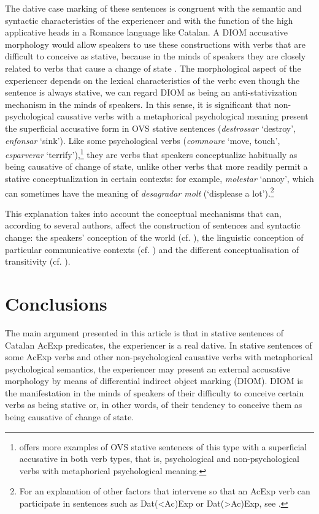 \documentclass[output=paper,colorlinks,citecolor=brown,modfonts,nonflat]{langsci/langscibook}
\begin{document}
The dative case marking of these sentences is congruent with the semantic and syntactic characteristics of the experiencer and with the function of the high applicative heads in a Romance language like Catalan. A DIOM accusative morphology would allow speakers to use these constructions with verbs that are difficult to conceive as stative, because in the minds of speakers they are closely related to verbs that cause a change of state . The morphological aspect of the experiencer depends on the lexical characteristics of the verb: even though the sentence is always stative, we can regard DIOM as being an anti-stativization mechanism in the minds of speakers. In this sense, it is significant that non-psychological causative verbs with a metaphorical psychological meaning present the superficial accusative form in OVS stative sentences (\textit{destrossar} ‘destroy’, \textit{enfonsar} ‘sink’). Like some psychological verbs (\textit{commoure} ‘move, touch’, \textit{esparverar} ‘terrify’),\footnote{\citet[14, 29--30]{Ginebra2003} offers more examples of OVS stative sentences of this type with a superficial accusative in both verb types, that is, psychological and non-psychological verbs with metaphorical psychological meaning.} they are verbs that speakers conceptualize habitually as being causative of change of state, unlike other verbs that more readily permit a stative conceptualization in certain contexts: for example, \textit{molestar} ‘annoy’, which can sometimes have the meaning of \textit{desagradar molt} (‘displease a lot').\footnote{For an explanation of other factors that intervene so that an AcExp verb can participate in sentences such as Dat(<Ac)Exp or Dat(>Ac)Exp, see \citet[Section 5]{Royo2017}.}

This explanation takes into account the conceptual mechanisms that can, according to several authors, affect the construction of sentences and syntactic change: the speakers’ conception of the world (cf. \citealt{Ramos2002}), the linguistic conception of particular communicative contexts (cf. \citealt{Rossello2008}) and the different conceptualisation of transitivity (cf. \citealt{Ynglès2011, Pineda2012}).

\section{Conclusions}\label{sec:royo:6}

The main argument presented in this article is that in stative sentences of Catalan AcExp predicates, the experiencer is a real dative. In stative sentences of some AcExp verbs and other non-psychological causative verbs with metaphorical psychological semantics, the experiencer may present an external accusative morphology by means of differential indirect object marking (DIOM). DIOM is the manifestation in the minds of speakers of their difficulty to conceive certain verbs as being stative or, in other words, of their tendency to conceive them as being causative of change of state.
\end{document}
